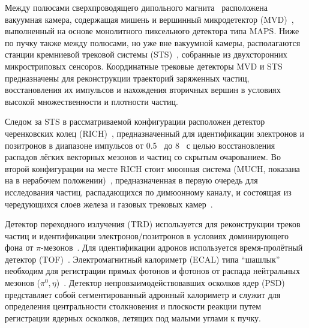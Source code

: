 
Между полюсами сверхпроводящего дипольного магнита~\cite{TDR_Magnet} расположена вакуумная камера, содержащая мишень и вершинный микродетектор (MVD)~\cite{MVD_KOZIEL}, выполненный на основе монолитного пиксельного детектора типа MAPS. Ниже по пучку также между полюсами, но уже вне вакуумной камеры, располагаются станции кремниевой трековой системы (STS)~\cite{TDR_STS}, собранные из двухсторонних микростриповых сенсоров. Координатные трековые детекторы MVD и STS предназначены для реконструкции траекторий заряженных частиц, восстановления их импульсов и нахождения вторичных вершин в условиях высокой множественности и плотности частиц.



Следом за STS в рассматриваемой конфигурации расположен детектор черенковских колец (RICH)~\cite{TDR_RICH}, предназначенный для идентификации электронов и позитронов в диапазоне импульсов от 0.5~\GeVoverC{} до 8~\GeVoverC{} с целью восстановления распадов лёгких векторных мезонов и частиц со скрытым очарованием. Во второй конфигурации на месте RICH стоит мюонная система (MUCH, показана на  в нерабочем положении)~\cite{TDR_MUCH}, предназначенная в первую очередь для исследования частиц, распадающихся по димюонному каналу, и состоящая из чередующихся слоев железа и газовых трековых камер~\cite{GEM}.

Детектор переходного излучения (TRD) используется для реконструкции треков частиц и идентификации электронов/позитронов в условиях доминирующего фона от $\pi$-мезонов~\cite{TRD}. Для идентификации адронов используется время-пролётный детектор (TOF)~\cite{TDR_TOF}. Электромагнитный калориметр (ECAL) типа ``шашлык'' необходим для регистрации прямых фотонов и фотонов от распада нейтральных мезонов ($ \pi^{0}, \eta $)~\cite{ECAL_KOROLKO}. Детектор непровзаимодействовавших осколков ядер (PSD)~\cite{TDR_PSD} представляет собой сегментированный адронный калориметр и служит для определения центральности столкновения и плоскости реакции путем регистрации ядерных осколков, летящих под малыми углами к пучку.

